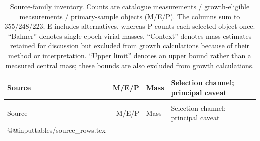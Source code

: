 \documentclass[pdflatex,sn-basic]{sn-jnl}
\makeatletter
\newcommand{\tableinput}[1]{\csname @@input\endcsname #1 }
\makeatother
\begin{document}
\par\bigskip
\begingroup\footnotesize
\setlength{\tabcolsep}{4pt}
\begin{longtable}{@{}>{\raggedright\arraybackslash}p{}rp{}>{\raggedright\arraybackslash}p{}@{}}
\caption{Source-family inventory. Counts are catalogue measurements / growth-eligible
measurements / primary-sample objects (M/E/P).
The columns sum to 355/248/223; E includes alternatives, whereas P counts each
selected object once. ``Balmer'' denotes single-epoch virial masses.
``Context'' denotes mass estimates retained for discussion but excluded from
growth calculations because of their method or interpretation.
``Upper limit'' denotes an upper bound rather than a measured central mass;
these bounds are also excluded from growth calculations.
}
\label{tab:sources}\\
\toprule Source & M/E/P & Mass & Selection channel; principal caveat \\\midrule
\endfirsthead
\multicolumn{4}{l}{Table~\ref{tab:sources} continued}\\
\toprule Source & M/E/P & Mass & Selection channel; principal caveat \\\midrule
\endhead
\bottomrule\endfoot
\tableinput{tables/source_rows.tex}
\end{longtable}
\endgroup
\end{document}
